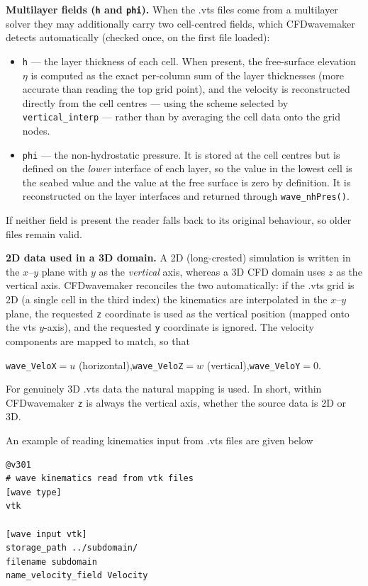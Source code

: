 \textbf{Multilayer fields (\texttt{h} and \texttt{phi}).} When the .vts files come from a multilayer solver they may additionally carry two cell-centred fields, which CFDwavemaker detects automatically (checked once, on the first file loaded):
\begin{itemize}
    \item \texttt{h} --- the layer thickness of each cell. When present, the free-surface elevation $\eta$ is computed as the exact per-column sum of the layer thicknesses (more accurate than reading the top grid point), and the velocity is reconstructed directly from the cell centres --- using the scheme selected by \texttt{vertical\_interp} --- rather than by averaging the cell data onto the grid nodes.
    \item \texttt{phi} --- the non-hydrostatic pressure. It is stored at the cell centres but is defined on the \emph{lower} interface of each layer, so the value in the lowest cell is the seabed value and the value at the free surface is zero by definition. It is reconstructed on the layer interfaces and returned through \texttt{wave\_nhPres()}.
\end{itemize}
If neither field is present the reader falls back to its original behaviour, so older files remain valid.

\textbf{2D data used in a 3D domain.} A 2D (long-crested) simulation is written in the $x$--$y$ plane with $y$ as the \emph{vertical} axis, whereas a 3D CFD domain uses $z$ as the vertical axis. CFDwavemaker reconciles the two automatically: if the .vts grid is 2D (a single cell in the third index) the kinematics are interpolated in the $x$--$y$ plane, the requested \texttt{z} coordinate is used as the vertical position (mapped onto the vts $y$-axis), and the requested \texttt{y} coordinate is ignored. The velocity components are mapped to match, so that
\begin{center}
\texttt{wave\_VeloX}$=u$ (horizontal),\quad \texttt{wave\_VeloZ}$=w$ (vertical),\quad \texttt{wave\_VeloY}$=0$.
\end{center}
For genuinely 3D .vts data the natural mapping is used. In short, within CFDwavemaker \texttt{z} is always the vertical axis, whether the source data is 2D or 3D.

An example of reading kinematics input from .vts files are given below
\begin{lstlisting}[]
@v301
# wave kinematics read from vtk files
[wave type]
vtk

[wave input vtk]
storage_path ../subdomain/
filename subdomain
name_velocity_field Velocity
\end{lstlisting}
